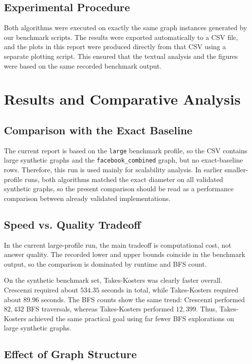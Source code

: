 \documentclass[11pt,a4paper]{article}
\begin{document}
\subsection{Experimental Procedure}
Both algorithms were executed on exactly the same graph instances generated by
our benchmark scripts. The results were exported automatically to a CSV file,
and the plots in this report were produced directly from that CSV using a
separate plotting script. This ensured that the textual analysis and the
figures were based on the same recorded benchmark output.

\section{Results and Comparative Analysis}

\subsection{Comparison with the Exact Baseline}

The current report is based on the \texttt{large} benchmark profile, so the CSV
contains large synthetic graphs and the \texttt{facebook\_combined} graph, but
no exact-baseline rows. Therefore, this run is used mainly for scalability
analysis. In earlier smaller-profile runs, both algorithms matched the exact
diameter on all validated synthetic graphs, so the present comparison should be
read as a performance comparison between already validated implementations.

\subsection{Speed vs. Quality Tradeoff}

In the current large-profile run, the main tradeoff is computational cost, not
answer quality. The recorded lower and upper bounds coincide in the benchmark
output, so the comparison is dominated by runtime and BFS count.

On the synthetic benchmark set, Takes-Kosters was clearly faster overall.
Crescenzi required about $534.35$ seconds in total, while Takes-Kosters
required about $89.96$ seconds. The BFS counts show the same trend:
Crescenzi performed $82{,}432$ BFS traversals, whereas Takes-Kosters performed
$12{,}399$. Thus, Takes-Kosters achieved the same practical goal using far
fewer BFS explorations on large synthetic graphs.

\subsection{Effect of Graph Structure}
\end{document}
